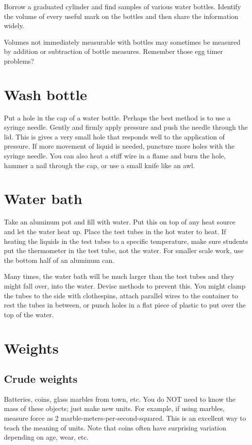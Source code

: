 Borrow a graduated cylinder and find samples of various water bottles. 
Identify the volume of every useful mark on the bottles 
and then share the information widely.

Volumes not immediately measurable with bottles 
may sometimes be measured by addition or subtraction of bottle measures. 
Remember those egg timer problems?

\section{Wash bottle}
\label{sec:wash-bottle}
Put a hole in the cap of a water bottle. 
Perhaps the best method is to use a syringe needle. 
Gently and firmly apply pressure and push the needle through the lid. 
This is gives a very small hole 
that responds well to the application of pressure. 
If more movement of liquid is needed, 
puncture more holes with the syringe needle. 
You can also heat a stiff wire in a flame and burn the hole, 
hammer a nail through the cap, 
or use a small knife like an awl.

\section{Water bath}
\label{sec:hotwaterbathes}
Take an aluminum pot and fill with water. 
Put this on top of any heat source and let the water heat up. 
Place the test tubes in the hot water to heat. 
If heating the liquids in the test tubes to a specific temperature, 
make sure students put the thermometer in the test tube, 
not the water. 
For smaller scale work, 
use the bottom half of an aluminum can.

Many times, 
the water bath will be much larger than the test tubes 
and they might fall over, 
into the water. 
Devise methods to prevent this. 
You might clamp the tubes to the side with clothespins, 
attach parallel wires to the container to rest the tubes in between, 
or punch holes in a flat piece of plastic to put over the top of the water.

\section{Weights}
\label{sec:weights}

\subsection{Crude weights}
Batteries, 
coins, 
glass marbles from town, 
etc. 
You do NOT need to know the mass of these objects; just make new units. 
For example, 
if using marbles, 
measure force as 2 marble-meters-per-second-squared. 
This is an excellent way to teach the meaning of units. 
Note that coins often have surprising variation depending on age, 
wear, 
etc.

